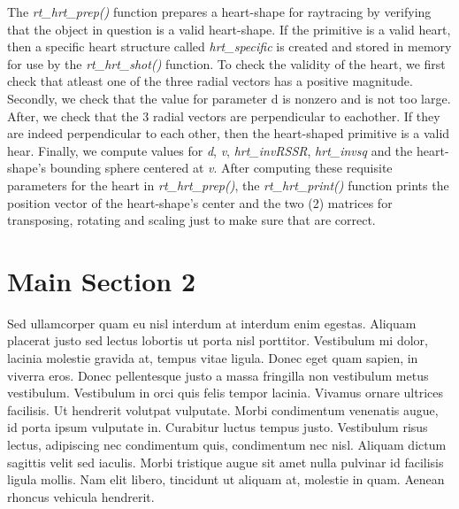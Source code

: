 The   \textit{rt\_hrt\_prep()}   function   prepares   a   heart-­shape   for   ray­tracing   by  
verifying   that   the   object   in   question   is   a   valid   heart-­shape.   If   the   primitive   is   a  
valid   heart,   then   a   specific   heart   structure   called   \textit{hrt\_specific}   is   created   and  
stored   in   memory   for   use   by   the   \textit{rt\_hrt\_shot()}   function.   To   check   the   validity   of  
the   heart,   we   first   check   that   atleast   one   of   the   three   radial   vectors   has   a  
positive   magnitude.   Secondly,   we   check   that   the   value   for   parameter   d   is  
non­zero   and   is   not   too   large.   After,   we   check   that   the   3   radial   vectors   are  
perpendicular   to   eachother.   If   they   are   indeed   perpendicular   to   each   other,   then  
the   heart­-shaped   primitive   is   a   valid   hear.   Finally,   we   compute   values   for   \textit{d},   \textit{v},  
\textit{hrt\_invRSSR},   \textit{hrt\_invsq}   and   the   heart-shape's   bounding   sphere   centered   at   \textit{v}.   After  
computing   these   requisite   parameters   for   the   heart   in   \textit{rt\_hrt\_prep()},   the  
\textit{rt\_hrt\_print()}   function   prints   the   position   vector   of   the   heart-­shape's   center   and  
the   two   (2)   matrices   for   transposing,   rotating   and   scaling   just   to   make   sure   that  
are correct.



\section{Main Section 2}

Sed ullamcorper quam eu nisl interdum at interdum enim egestas. Aliquam placerat justo sed lectus lobortis ut porta nisl porttitor. Vestibulum mi dolor, lacinia molestie gravida at, tempus vitae ligula. Donec eget quam sapien, in viverra eros. Donec pellentesque justo a massa fringilla non vestibulum metus vestibulum. Vestibulum in orci quis felis tempor lacinia. Vivamus ornare ultrices facilisis. Ut hendrerit volutpat vulputate. Morbi condimentum venenatis augue, id porta ipsum vulputate in. Curabitur luctus tempus justo. Vestibulum risus lectus, adipiscing nec condimentum quis, condimentum nec nisl. Aliquam dictum sagittis velit sed iaculis. Morbi tristique augue sit amet nulla pulvinar id facilisis ligula mollis. Nam elit libero, tincidunt ut aliquam at, molestie in quam. Aenean rhoncus vehicula hendrerit.
